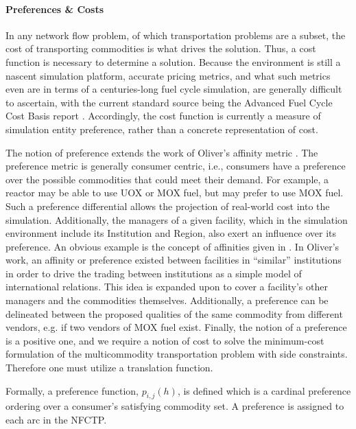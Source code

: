 \paragraph{Preferences \& Costs}

In any network flow problem, of which transportation problems are a subset, the
cost of transporting commodities is what drives the solution. Thus, a cost
function is necessary to determine a solution. Because the \Cyclus environment
is still a nascent simulation platform, accurate pricing metrics, and what such
metrics even are in terms of a centuries-long fuel cycle simulation, are
generally difficult to ascertain, with the current standard source being the
Advanced Fuel Cycle Cost Basis report
\cite{shropshire_advanced_2009}. Accordingly, the cost function is currently a
measure of simulation entity preference, rather than a concrete representation
of cost.

The notion of preference extends the work of Oliver's affinity metric
\cite{oliver_geniusv2:_2009}. The preference metric is generally consumer
centric, i.e., consumers have a preference over the possible commodities that
could meet their demand. For example, a reactor may be able to use UOX or MOX
fuel, but may prefer to use MOX fuel. Such a preference differential allows the
projection of real-world cost into the simulation. Additionally, the managers of
a given facility, which in the \Cyclus simulation environment include its
Institution and Region, also exert an influence over its preference. An obvious
example is the concept of affinities given in \cite{oliver_geniusv2:_2009}. In
Oliver's work, an affinity or preference existed between facilities in
``similar'' institutions in order to drive the trading between institutions as a
simple model of international relations. This idea is expanded upon to cover a
facility's other managers and the commodities themselves. Additionally, a
preference can be delineated between the proposed qualities of the same
commodity from different vendors, e.g. if two vendors of MOX fuel
exist. Finally, the notion of a preference is a positive one, and we require a
notion of cost to solve the minimum-cost formulation of the multicommodity
transportation problem with side constraints. Therefore one must utilize a
translation function.

Formally, a preference function, $p_{i, j}(h)$, is defined which is a cardinal
preference ordering over a consumer's satisfying commodity set. A preference is
assigned to each arc in the NFCTP.

